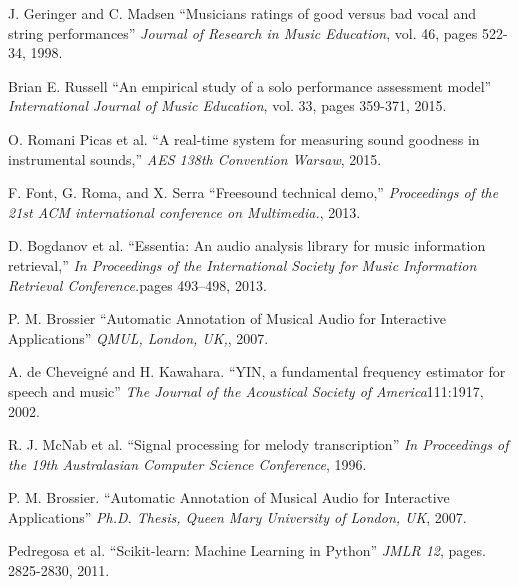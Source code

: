 \documentclass{article}
\begin{document}
\begin{thebibliography}{citations}
%
J. Geringer and C. Madsen
``Musicians ratings of good versus bad vocal and string performances''
{\it Journal of Research in Music Education}, vol. 46, pages 522-34, 1998.

Brian E. Russell
``An empirical study of a solo performance assessment model''
{\it  International Journal of Music Education}, vol. 33, pages 359-371, 2015.

O. Romani Picas et al.
``A real-time system for measuring sound goodness in instrumental sounds,''
{\it AES 138th Convention Warsaw}, 2015.

 F. Font, G. Roma, and X. Serra
``Freesound technical demo,''
{\it Proceedings of the 21st ACM international conference on Multimedia.}, 2013.

 D. Bogdanov et al.
``Essentia: An audio analysis library for music information retrieval,''
{\it  In Proceedings of the International Society for Music Information Retrieval Conference.}pages 493–498, 2013.

 P. M. Brossier
``Automatic Annotation of Musical Audio for Interactive Applications''
{\it QMUL, London, UK,}, 2007.

 A. de Cheveigné and H. Kawahara.
``YIN, a fundamental frequency estimator for speech and music''
{\it The Journal of the Acoustical Society of America}111:1917, 2002.

 R. J. McNab et al.
``Signal processing for melody transcription''
{\it In Proceedings of the 19th Australasian Computer Science Conference}, 1996.

P. M. Brossier.
``Automatic Annotation of Musical Audio for Interactive Applications''
{\it Ph.D. Thesis, Queen Mary University of London, UK}, 2007.

Pedregosa et al.
``Scikit-learn: Machine Learning in Python''
{\it JMLR 12}, pages. 2825-2830, 2011.


\end{thebibliography}
\end{document}
